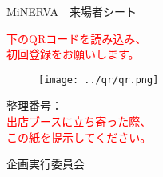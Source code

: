 \documentclass[a4paper,14pt]{jsarticle}
\begin{document}
\begin{center}
    {\Huge	MiNERVA　来場者シート}

    \textcolor{red}{
        {\LARGE
                下のQRコードを読み込み、\\初回登録をお願いします。
            }
    }

    \begin{figure}[h]
        \centering
        \texttt{[image: ../qr/qr.png]}
    \end{figure}

    {\huge
    整理番号：
    \\
    }
    \textcolor{red}{
        {\LARGE
        出店ブースに立ち寄った際、\\この紙を提示してください。
    }
    }

\end{center}

\begin{flushright}
    {\LARGE
    企画実行委員会
    }
\end{flushright}
\end{document}
